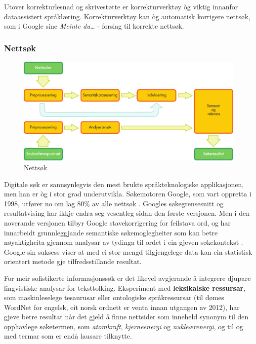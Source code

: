 \begin{multicols}{2}
Utover korrekturlesnad og skrivestøtte er korrekturverktøy òg viktig innanfor dataassistert språklæring. Korrekturverktøy kan òg automatisk korrigere nettsøk, som i Google sine \textit{Meinte du…}  - forslag til korrekte nettsøk.

\subsubsection{Nettsøk}

\begin{figure}[htb]
  \center
  \includegraphics[width=\textwidth]{../_media/norwegian-nynorsk/web_search_architecture}
  \caption{Nettsøk}
  \label{fig:websearcharch_no}
 \end{figure}

Digitale søk er sannsynlegvis den mest brukte språkteknologiske applikasjonen, men han er òg i stor grad underutvikla. Søkemotoren Google, som vart oppretta i 1998, utfører no om lag 80\% av alle nettsøk \cite{spi1}. 
Googles søkegrensesnitt og resultatvising har ikkje endra seg vesentleg sidan den første versjonen. Men i den noverande versjonen tilbyr Google stavekorrigering for feilstava ord, og har innarbeidt grunnleggjande semantiske søkemoglegheiter som kan betre nøyaktigheita gjennom analysar av tydinga til ordet i ein gjeven søkekontekst \cite{pc1}. Google sin suksess viser at med ei stor mengd tilgjengelege data kan ein statistisk orientert metode gje tilfredsstillande resultat. 

For meir sofistikerte informasjonssøk er det likevel avgjerande å integrere djupare lingvistiske analysar for teksttolking. Eksperiment med \textbf{leksikalske ressursar}, som maskinleselege tesaurusar eller ontologiske språkressursar (til dømes WordNet for engelsk, eit norsk ordnett er venta innan utgangen av 2012), har gjeve betre resultat når det gjeld å finne nettsider som inneheld synonym til den opphavlege søketermen, som
\textit{atomkraft}, \textit{kjerneenergi} og \textit{nukleærenergi}, og til og med termar som er endå lausare tilknytte.  


\end{multicols}
